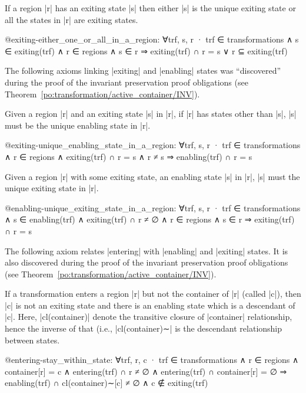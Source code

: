 \begin{axiom}
\label{axm:@exiting-either_one_or_all_in_a_region}
If a region |r| has an exiting state |s| then either |s| is the unique exiting state or all the states in |r| are exiting states.
\begin{EventBcode}
@exiting-either_one_or_all_in_a_region: 
    ∀trf, s, r · trf ∈ transformations ∧ s ∈ exiting(trf) ∧ r ∈ regions ∧ s ∈ r
        ⇒ exiting(trf) ∩ r = {s} ∨ r ⊆ exiting(trf)
\end{EventBcode}
\end{axiom}

The following axioms linking |exiting| and |enabling| states was ``discovered'' during the proof of the invariant preservation proof obligations (see Theorem~\ref{po:transformation/active_container/INV}).
\begin{axiom}
\label{axm:@exiting-unique_enabling_state_in_a_region}
Given a region |r| and an exiting state |s| in |r|, if |r| has states other than |s|, |s| must be the unique enabling state in |r|.
\begin{EventBcode}
@exiting-unique_enabling_state_in_a_region:
    ∀trf, s, r · trf ∈ transformations ∧ r ∈ regions ∧ exiting(trf) ∩ r = {s} ∧ r ≠ {s}
        ⇒ enabling(trf) ∩ r = {s}
\end{EventBcode}
\end{axiom}
\begin{axiom}
\label{axm:@enabling-unique_exiting_state_in_a_region}
Given a region |r| with some exiting state, an enabling state |s| in |r|, |s| must the unique exiting state in |r|.
\begin{EventBcode}
@enabling-unique_exiting_state_in_a_region:
    ∀trf, s, r · trf ∈ transformations ∧ s ∈ enabling(trf) ∧
    exiting(trf) ∩ r ≠ ∅ ∧ r ∈ regions ∧ s ∈ r ⇒ exiting(trf) ∩ r = {s}
\end{EventBcode}
\end{axiom}

The following axiom relates |entering| with |enabling| and |exiting| states. It is also discovered during the proof of the invariant preservation proof obligations (see Theorem~\ref{po:transformation/active_container/INV}).
\begin{axiom}
\label{axm:@entering-stay_within_state}
If a transformation enters a region |r| but not the container of |r| (called |c|), then |c| is not an exiting state and there is an enabling state which is a descendant of |c|. Here, |cl(container)| denote the transitive closure of |container| relationship, hence the inverse of that (i.e., |cl(container)∼| is the descendant relationship between states.
\begin{EventBcode}
@entering-stay_within_state:
    ∀trf, r, c · trf ∈ transformations ∧ r ∈ regions ∧ container[r] = {c} ∧
    entering(trf) ∩ r ≠ ∅ ∧ entering(trf) ∩ container[r] = ∅
        ⇒ enabling(trf) ∩ cl(container)∼[{c}] ≠ ∅ ∧ c ∉ exiting(trf) 
\end{EventBcode}
\end{axiom}


